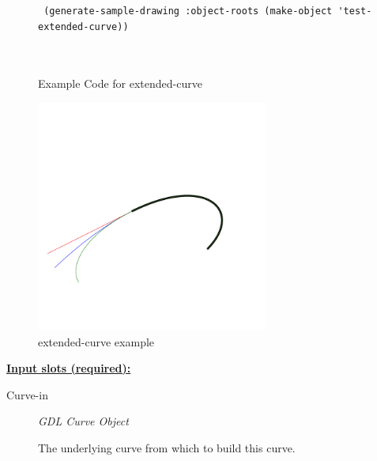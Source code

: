 \documentclass [11pt]{book}
\begin{document}
\begin{itemize}
\begin{figure}
\begin{lrbox}{\boxedverb}
\begin{minipage}{\linewidth}
{\begin{verbatim}
 (generate-sample-drawing :object-roots (make-object 'test-extended-curve))

   
\end{verbatim}}
\end{minipage}
\end{lrbox}
\fbox{\usebox{\boxedverb}}

\caption{Example Code for extended-curve}

\label{fig:example-code-extended-curve}

\end{figure}

\begin{figure}
\begin{center}
\includegraphics[width=3in,height=3in]{../images/example-extended-curve.pdf}
\end{center}

\caption{extended-curve example}

\label{fig:extended-curve}

\end{figure}





\textbf{
\underline{Input slots (required):}}

\begin{description}

\item [Curve-in]
\emph{GDL Curve Object}

 The underlying curve from which to build this curve.




\end{description}







\end{itemize}
\end{document}
